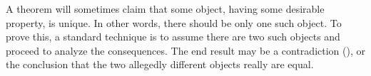 \begin{para}A theorem will sometimes claim that some object, having some desirable property, is unique.  In other words, there should be only one such object.  To prove this, a standard technique is to assume there are two such objects and proceed to analyze the consequences.  The end result may be a contradiction (), or the conclusion that the two allegedly different objects really are equal.\end{para}
